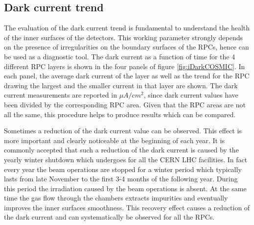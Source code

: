 \subsection{Dark current trend}
The evaluation of the dark current trend is fundamental to understand the health of the inner surfaces of the detectors.
This working parameter strongly depends on the presence of irregularities on the boundary surfaces of the RPCs, hence can be used as a diagnostic tool.
The dark current as a function of time for the 4 different RPC layers is shown in the four panels of figure \ref{fig:iDarkCOSMIC}. 
In each panel, the average dark current of the layer as well as the trend for the RPC drawing the largest and the smaller current in that layer are shown.
The dark current measurements are reported in $\mu A/cm^2$, since dark current values have been divided by the corresponding RPC area.
Given that the RPC areas are not all the same, this procedure helps to produce results which can be compared.


Sometimes a reduction of the dark current value can be observed.
This effect is more important and clearly noticeable at the beginning of each year.
It is commonly accepted that such a reduction of the dark current is caused by the yearly winter shutdown which undergoes for all the CERN LHC facilities.
In fact every year the beam operations are stopped for a winter period which typically lasts from late November to the first 3-4 months of the following year.
During this period the irradiation caused by the beam operations is absent.
At the same time the gas flow through the chambers extracts impurities and eventually improves the inner surfaces smoothness.
This recovery effect causes a reduction of the dark current and can systematically be observed for all the RPCs.

